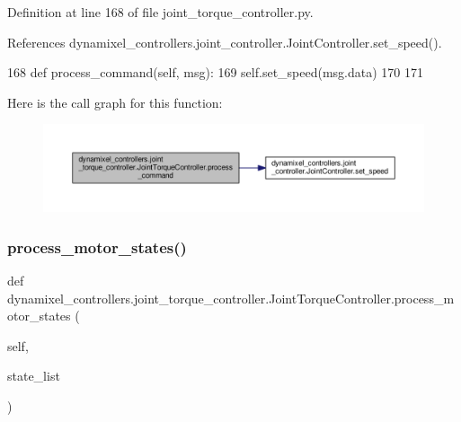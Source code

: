 Definition at line 168 of file joint\+\_\+torque\+\_\+controller.\+py.



References dynamixel\+\_\+controllers.\+joint\+\_\+controller.\+Joint\+Controller.\+set\+\_\+speed().


\begin{DoxyCode}
168     \textcolor{keyword}{def }process\_command(self, msg):
169         self.set\_speed(msg.data)
170 
171 \end{DoxyCode}
Here is the call graph for this function\+:
\nopagebreak
\begin{figure}[H]
\begin{center}
\leavevmode
\includegraphics[width=350pt]{db/d80/classdynamixel__controllers_1_1joint__torque__controller_1_1_joint_torque_controller_a4bb191d488e477451bf954fb439f3573_cgraph}
\end{center}
\end{figure}
\mbox{\label{classdynamixel__controllers_1_1joint__torque__controller_1_1_joint_torque_controller_a272b1c9a711f608b3761e27a30e0ec80}} 
\subsubsection{\texorpdfstring{process\+\_\+motor\+\_\+states()}{process\_motor\_states()}}
{\footnotesize\ttfamily def dynamixel\+\_\+controllers.\+joint\+\_\+torque\+\_\+controller.\+Joint\+Torque\+Controller.\+process\+\_\+motor\+\_\+states (\begin{DoxyParamCaption}\item[{}]{self,  }\item[{}]{state\+\_\+list }\end{DoxyParamCaption})}



